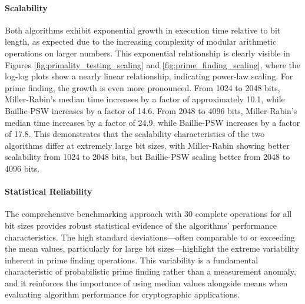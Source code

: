 \paragraph{Scalability}
Both algorithms exhibit exponential growth in execution time relative to bit length, as expected due to the increasing complexity of modular arithmetic operations on larger numbers. This exponential relationship is clearly visible in Figures \ref{fig:primality_testing_scaling} and \ref{fig:prime_finding_scaling}, where the log-log plots show a nearly linear relationship, indicating power-law scaling. For prime finding, the growth is even more pronounced. From 1024 to 2048 bits, Miller-Rabin's median time increases by a factor of approximately 10.1, while Baillie-PSW increases by a factor of 14.6. From 2048 to 4096 bits, Miller-Rabin's median time increases by a factor of 24.9, while Baillie-PSW increases by a factor of 17.8. This demonstrates that the scalability characteristics of the two algorithms differ at extremely large bit sizes, with Miller-Rabin showing better scalability from 1024 to 2048 bits, but Baillie-PSW scaling better from 2048 to 4096 bits.

\paragraph{Statistical Reliability}
The comprehensive benchmarking approach with 30 complete operations for all bit sizes provides robust statistical evidence of the algorithms' performance characteristics. The high standard deviations—often comparable to or exceeding the mean values, particularly for large bit sizes—highlight the extreme variability inherent in prime finding operations. This variability is a fundamental characteristic of probabilistic prime finding rather than a measurement anomaly, and it reinforces the importance of using median values alongside means when evaluating algorithm performance for cryptographic applications.

